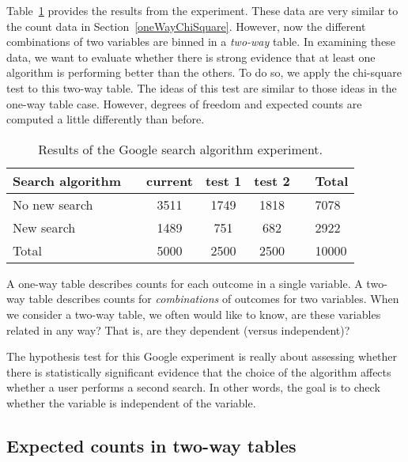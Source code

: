 Table~\ref{googleSearchAlgorithmByAlgorithmAndPerformanceWithTotals} provides the results from the experiment. These data are very similar to the count data in Section~\ref{oneWayChiSquare}. However, now the different combinations of two variables are binned in a \emph{two-way} table. In examining these data, we want to evaluate whether there is strong evidence that at least one algorithm is performing better than the others. To do so, we apply the chi-square test to this two-way table. The ideas of this test are similar to those ideas in the one-way table case. However, degrees of freedom and expected counts are computed a little differently than before.
\begin{table}[h]
\centering
\begin{tabular}{ll ccc ll}
\hline
Search algorithm & \hspace{1mm} & current & test 1 & test 2 & \hspace{1mm} & Total \\
\hline
No new search				   & & 3511    & 1749 & 1818 & 				& 7078 \\
New search				   & & 1489    & 751	& 682    &				& 2922 \\
\hline
Total						   & & 5000    & 2500 & 2500 & 				& 10000 \\
\hline
\end{tabular}
\caption{Results of the Google search algorithm experiment.}
\label{googleSearchAlgorithmByAlgorithmAndPerformanceWithTotals}
\end{table}

\begin{tipBox}{
A one-way table describes counts for each outcome in a single variable. A two-way table describes counts for \emph{combinations} of outcomes for two variables. When we consider a two-way table, we often would like to know, are these variables related in any way? That is, are they dependent (versus independent)?}
\end{tipBox}

The hypothesis test for this Google experiment is really about assessing whether there is statistically significant evidence that the choice of the algorithm affects whether a user performs a second search. In other words, the goal is to check whether the  variable is independent of the  variable.

\subsection{Expected counts in two-way tables}

